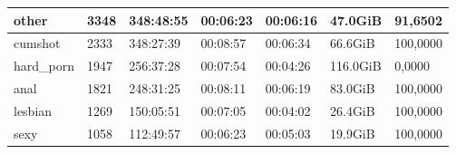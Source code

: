 \begin{table}[]
\begin{tabular}{l|l|l|l|l|l|l}
other                                              & 3348                                                & 348:48:55                                                & 00:06:23                                                & 00:06:16                                               & 47.0GiB                                              & 91,6502                                                       \\ \hline
cumshot                                            & 2333                                                & 348:27:39                                                & 00:08:57                                                & 00:06:34                                               & 66.6GiB                                              & 100,0000                                                      \\ \hline
hard\_porn                                         & 1947                                                & 256:37:28                                                & 00:07:54                                                & 00:04:26                                               & 116.0GiB                                             & 0,0000                                                        \\ \hline
anal                                               & 1821                                                & 248:31:25                                                & 00:08:11                                                & 00:06:19                                               & 83.0GiB                                              & 100,0000                                                      \\ \hline
lesbian                                            & 1269                                                & 150:05:51                                                & 00:07:05                                                & 00:04:02                                               & 26.4GiB                                              & 100,0000                                                      \\ \hline
sexy                                               & 1058                                                & 112:49:57                                                & 00:06:23                                                & 00:05:03                                               & 19.9GiB                                              & 100,0000                                                      \\ \hline

\end{tabular}
\end{table}
